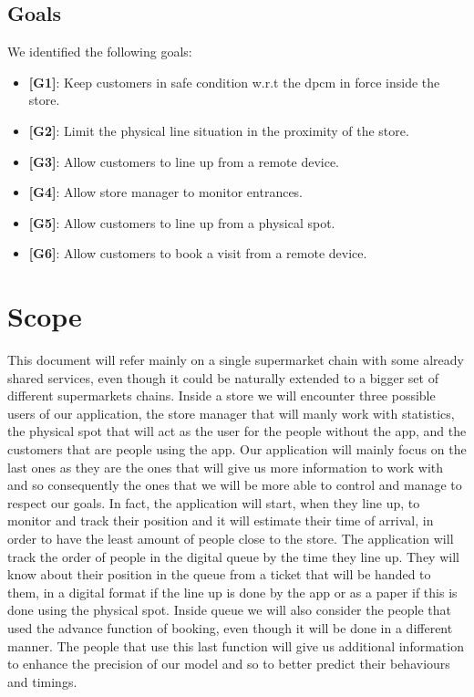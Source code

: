 \subsection{Goals}

We identified the following goals:

\begin{itemize}

	\item {\textbf{[G1]}}: Keep customers in safe condition w.r.t the \gls{dpcm} in force inside the store.
		
	\item {\textbf{[G2]}}: Limit the physical line situation in the proximity of the store.
		
	\item {\textbf{[G3]}}: Allow customers to line up from a remote device.
	
	\item {\textbf{[G4]}}: Allow store manager to monitor entrances.
	
	\item {\textbf{[G5]}}: Allow customers to line up from a physical spot.
	
	\item {\textbf{[G6]}}: Allow customers to book a visit from a remote
device.

	
\end{itemize}

\section{Scope}

This document will refer mainly on a single supermarket chain with some already shared services, even though it could be naturally extended to a bigger set of different supermarkets chains. Inside a store we will encounter three possible users of our application, the store manager that will manly work with statistics, the physical spot that will act as the user for the people without the app, and the customers that are people using the app.
 Our application will mainly focus on the last ones as they are the ones that will give us more information to work with and so consequently the ones that we will be more able to control and manage to respect our goals. In fact, the application will start, when they line up, to monitor and track their position and it will estimate their time of arrival, in order to have the least amount of people close to the store.
The application will track the order of people in the digital queue by the time they line up. They will know about their position in the queue from a ticket that will be handed to them, in a digital format if the line up is done by the app or as a paper if this is done using the physical spot. Inside queue we will also consider the people that used the advance function of booking, even though it will be done in a different manner. The people that use this last function will give us additional information to enhance the precision of our model and so to better predict their behaviours and timings. 

